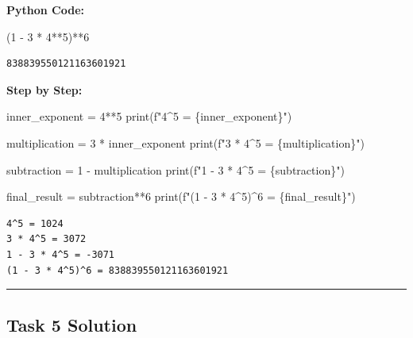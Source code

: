 \documentclass[
  11pt,
]{article}
\newenvironment{Shaded}{\begin{snugshade}}{\end{snugshade}}
\newcommand{\BuiltInTok}[1]{\textcolor[rgb]{0.00,0.23,0.31}{#1}}
\newcommand{\DecValTok}[1]{\textcolor[rgb]{0.68,0.00,0.00}{#1}}
\newcommand{\NormalTok}[1]{\textcolor[rgb]{0.00,0.23,0.31}{#1}}
\newcommand{\OperatorTok}[1]{\textcolor[rgb]{0.37,0.37,0.37}{#1}}
\newcommand{\SpecialCharTok}[1]{\textcolor[rgb]{0.37,0.37,0.37}{#1}}
\newcommand{\SpecialStringTok}[1]{\textcolor[rgb]{0.13,0.47,0.30}{#1}}
\begin{document}
\textbf{Python Code:}

\begin{Shaded}
\begin{Highlighting}[]
\NormalTok{(}\DecValTok{1} \OperatorTok{{-}} \DecValTok{3} \OperatorTok{*} \DecValTok{4}\OperatorTok{**}\DecValTok{5}\NormalTok{)}\OperatorTok{**}\DecValTok{6}
\end{Highlighting}
\end{Shaded}

\begin{verbatim}
838839550121163601921
\end{verbatim}

\textbf{Step by Step:}

\begin{Shaded}
\begin{Highlighting}[]
\NormalTok{inner\_exponent }\OperatorTok{=} \DecValTok{4}\OperatorTok{**}\DecValTok{5}
\BuiltInTok{print}\NormalTok{(}\SpecialStringTok{f"4\^{}5 = }\SpecialCharTok{\{}\NormalTok{inner\_exponent}\SpecialCharTok{\}}\SpecialStringTok{"}\NormalTok{)}

\NormalTok{multiplication }\OperatorTok{=} \DecValTok{3} \OperatorTok{*}\NormalTok{ inner\_exponent}
\BuiltInTok{print}\NormalTok{(}\SpecialStringTok{f"3 * 4\^{}5 = }\SpecialCharTok{\{}\NormalTok{multiplication}\SpecialCharTok{\}}\SpecialStringTok{"}\NormalTok{)}

\NormalTok{subtraction }\OperatorTok{=} \DecValTok{1} \OperatorTok{{-}}\NormalTok{ multiplication}
\BuiltInTok{print}\NormalTok{(}\SpecialStringTok{f"1 {-} 3 * 4\^{}5 = }\SpecialCharTok{\{}\NormalTok{subtraction}\SpecialCharTok{\}}\SpecialStringTok{"}\NormalTok{)}

\NormalTok{final\_result }\OperatorTok{=}\NormalTok{ subtraction}\OperatorTok{**}\DecValTok{6}
\BuiltInTok{print}\NormalTok{(}\SpecialStringTok{f"(1 {-} 3 * 4\^{}5)\^{}6 = }\SpecialCharTok{\{}\NormalTok{final\_result}\SpecialCharTok{\}}\SpecialStringTok{"}\NormalTok{)}
\end{Highlighting}
\end{Shaded}

\begin{verbatim}
4^5 = 1024
3 * 4^5 = 3072
1 - 3 * 4^5 = -3071
(1 - 3 * 4^5)^6 = 838839550121163601921
\end{verbatim}

\begin{center}\rule{0.5\linewidth}{0.5pt}\end{center}

\subsection{Task 5 Solution}\label{task-5-solution}
\end{document}
